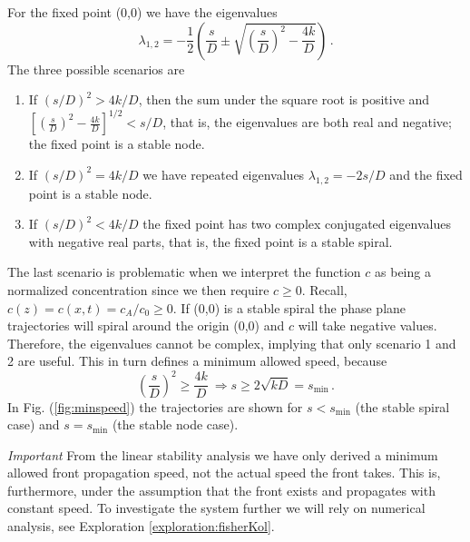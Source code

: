 For the fixed point (0,0) we have the eigenvalues
\begin{equation}
  \lambda_{1,2}=-\frac{1}{2}\left(
    \frac{s}{D} \pm \sqrt{\left(\frac{s}{D}\right)^2 - \frac{4k}{D}} 
  \right) \, .
\end{equation}
The three possible scenarios are 
\begin{enumerate}
	\item{
			If $(s/D)^2>4k/D$, then the sum under the square root is positive and  
			$\left[\left(\frac{s}{D}\right)^2 - \frac{4k}{D}\right]^{1/2} < s/D$, that is, the eigenvalues are 
			both real and negative; the fixed point is a stable node. 
		}
	\item {
			If $(s/D)^2=4k/D$ we have repeated eigenvalues $\lambda_{1,2}=-2s/D$ and the 
			fixed point is a stable node.
		}
	\item {
			If $(s/D)^2 < 4k/D$ the fixed point has two complex conjugated eigenvalues with negative 
			real parts, that is, the fixed point is a stable spiral.
		}
\end{enumerate}
The last scenario is problematic when we interpret the function $c$ as being a normalized concentration since we then 
require $c \geq 0$. Recall,  $c(z)=c(x,t)=c_A/c_0 \geq 0$. If (0,0) is a stable spiral the 
phase plane trajectories will spiral around the origin (0,0) and $c$ will take negative values. Therefore, the eigenvalues 
cannot be complex, implying that only scenario 1 and 2 are useful. This in turn defines a minimum allowed speed, because 
\begin{equation}
\left(\frac{s}{D}\right)^2 \geq \frac{4k}{D} \ \Rightarrow s \geq 2\sqrt{kD} = s_\text{min}
\, .
\end{equation}
In Fig. (\ref{fig:minspeed}) the trajectories are shown for $s<s_\text{min}$ (the stable spiral case) 
and $s=s_\text{min}$ (the stable node case). 

\textit{Important} From the linear stability analysis we have only derived a minimum allowed
front propagation speed, not the actual speed the front takes. 
This is, furthermore, under the assumption that the front exists and propagates with constant speed. 
To investigate the system further we will rely on numerical analysis, see Exploration \ref{exploration:fisherKol}. 

